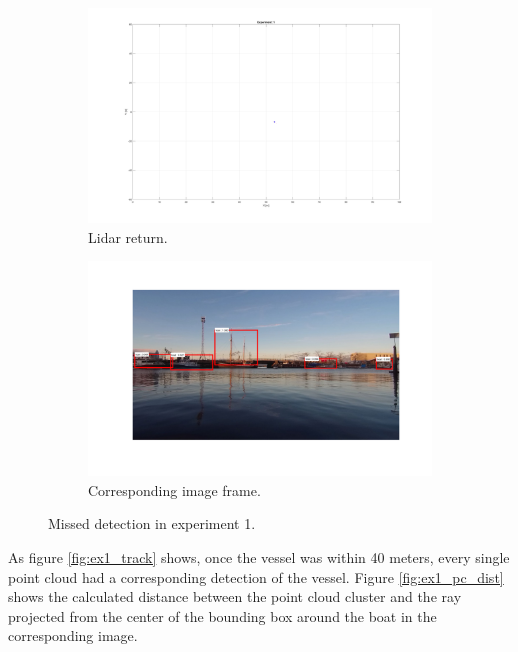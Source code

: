 \begin{figure}[H]
	\centering
	\begin{subfigure}[t]{.5\textwidth}
		\centering
		\includegraphics[width=\linewidth]{fig/exp1_50m.png}
		\caption{Lidar return.}
		\label{fig:sub_ex1_50m}
	\end{subfigure}%
	\begin{subfigure}[t]{.5\textwidth}
		\centering
		\includegraphics[width=\linewidth]{fig/exp1_bb_50m.png}
		\caption{Corresponding image frame.}
		\label{fig:sub_ex1_bb_50m}
	\end{subfigure}
	\caption{Missed detection in experiment 1.}
	\label{fig:ex1_50m}
\end{figure}
As figure \ref{fig:ex1_track} shows, once the vessel was within 40 meters, every single point cloud had a corresponding detection of the vessel. Figure \ref{fig:ex1_pc_dist} shows the calculated distance between the point cloud cluster and the ray projected from the center of the bounding box around the boat in the corresponding image.
